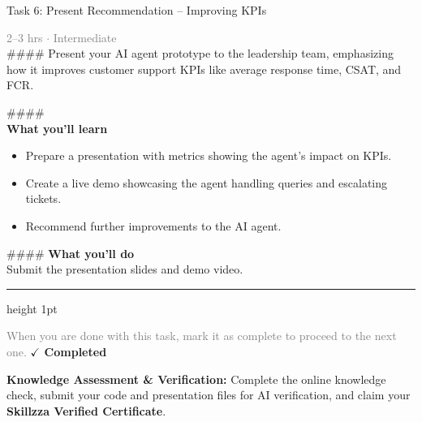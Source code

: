 \documentclass[10pt,a4paper]{article}
\begin{document}
\begin{taskbox}{Task 6: Present Recommendation – Improving KPIs}

    {\small \textcolor{gray}{2--3 hrs $\cdot$ Intermediate}}\\[12pt]

    \#\#\#\# 
Present your AI agent prototype to the leadership team, emphasizing how it improves customer support KPIs like average response time, CSAT, and FCR.

\#\#\#\# \\[10pt]
\vspace{8pt}
{\large \textbf{\textcolor{brandLight}{What you'll learn}}}\\[4pt]
\begin{itemize}
    \item Prepare a presentation with metrics showing the agent’s impact on KPIs.
    \item Create a live demo showcasing the agent handling queries and escalating tickets.
    \item Recommend further improvements to the AI agent.
\end{itemize}

\#\#\#\# \vspace{8pt}
{\large \textbf{\textcolor{brandLight}{What you'll do}}}\\[4pt]
Submit the presentation slides and demo video.\par

    \vspace{16pt}

    \textcolor{cardBorder}{\hrule height 1pt}\vspace{8pt}

    \small \textcolor{gray}{When you are done with this task, mark it as complete to proceed to the next one.} \hfill \textbf{\textcolor{brandDark}{$\checkmark$ Completed}}

\end{taskbox}

\begin{completionbox}
    \textbf{Knowledge Assessment \& Verification:} Complete the online knowledge check, submit your code and presentation files for AI verification, and claim your \textbf{Skillzza Verified Certificate}.
\end{completionbox}

\newpage

\end{document}
